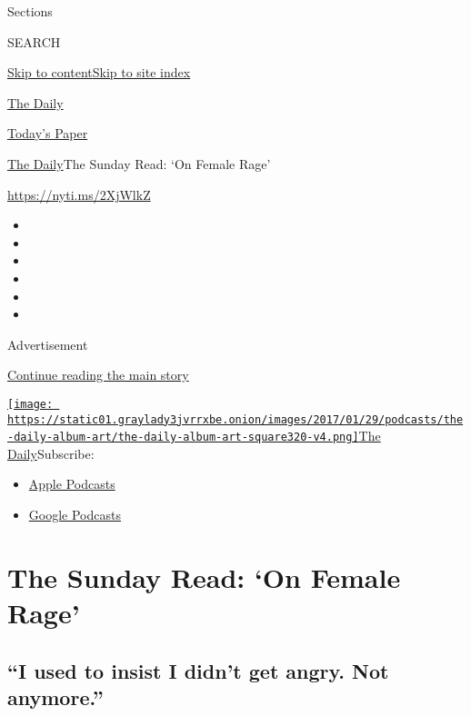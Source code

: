 Sections

SEARCH

\protect\hyperlink{site-content}{Skip to
content}\protect\hyperlink{site-index}{Skip to site index}

\href{https://www.nytimes3xbfgragh.onion/podcasts/the-daily}{The Daily}

\href{https://myaccount.nytimes3xbfgragh.onion/auth/login?response_type=cookie\&client_id=vi}{}

\href{https://www.nytimes3xbfgragh.onion/section/todayspaper}{Today's
Paper}

\href{/podcasts/the-daily}{The Daily}\textbar{}The Sunday Read: `On
Female Rage'

\url{https://nyti.ms/2XjWlkZ}

\begin{itemize}
\item
\item
\item
\item
\item
\item
\end{itemize}

Advertisement

\protect\hyperlink{after-top}{Continue reading the main story}

\href{https://www.nytimes3xbfgragh.onion/column/the-daily}{\texttt{[image: https://static01.graylady3jvrrxbe.onion/images/2017/01/29/podcasts/the-daily-album-art/the-daily-album-art-square320-v4.png]}The
Daily}Subscribe:

\begin{itemize}
\tightlist
\item
  \href{https://itunes.apple.com/us/podcast/id1200361736}{Apple
  Podcasts}
\item
  \href{https://www.google.com/podcasts?feed=aHR0cHM6Ly9yc3MuYXJ0MTkuY29tL3RoZS1kYWlseQ\%3D\%3D}{Google
  Podcasts}
\end{itemize}

\hypertarget{the-sunday-read-on-female-rage}{%
\section{The Sunday Read: `On Female
Rage'}\label{the-sunday-read-on-female-rage}}

\hypertarget{i-used-to-insist-i-didnt-get-angry-not-anymore}{%
\subsection{``I used to insist I didn't get angry. Not
anymore.''}\label{i-used-to-insist-i-didnt-get-angry-not-anymore}}

